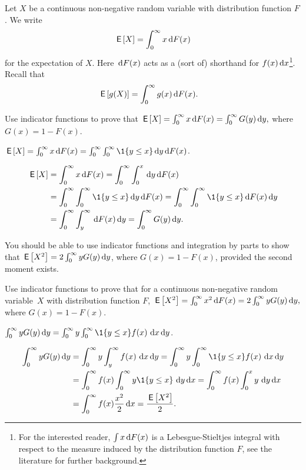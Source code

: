 Let $X$ be a continuous non-negative random variable with distribution function $F$. We write 
\begin{equation*}
 \,\mathsf{E}\left[X\right] = \int_0^\infty x \,\text{d}F(x)
\end{equation*}
for the expectation of $X$.
Here $\,\text{d}F(x)$ acts as a (sort of) shorthand for $f(x) \,\text{d}x$\footnote{For the interested reader, $\int x \,\text{d}F(x)$ is a Lebesgue-Stieltjes integral with respect to the measure induced by the distribution function $F$, see the literature for further background.}.
Recall that
\begin{align*}
\,\mathsf{E}\left[g(X)\right] &= \int_0^\infty g(x) \,\text{d}F(x).
\end{align*}



\begin{exercise}
 Use indicator functions to prove that 
$ \,\mathsf{E}\left[X\right] = \int_0^\infty x \,\text{d}F(x) = \int_0^\infty G(y) \,\text{d}y,$
where $G(x) = 1 - F(x)$. 
\begin{hint}
$\E X = \int_0^\infty x \d F(x) = \int_0^\infty \int_0^\infty \1{y\leq x} \d y \d F(x)$.
\end{hint}
\begin{solution}
 \begin{align*}
 \E{X} &= \int_0^\infty x \d F(x) = \int_0^\infty \int_0^x \d y \d F(x) \\
 & = \int_0^\infty \int_0^\infty \1{y\leq x} \d y \d F(x) = \int_0^\infty \int_0^\infty \1{y\leq x} \d F(x) \d y\\
 & = \int_0^\infty \int_y^\infty \d F(x) \d y = \int_0^\infty G(y) \d y.
 \end{align*}
\end{solution}
\end{exercise}

You should be able to use indicator functions and integration by parts to show that $\,\mathsf{E}\left[X^2\right] = 2\int_0^\infty y G(y) \,\text{d}y$, where $G(x) = 1- F(x)$, provided the second moment exists.

\begin{extra}
 Use indicator functions to prove that for a continuous non-negative random variable~$X$ with distribution function $F$, $ \,\mathsf{E}\left[X^2\right] = \int_0^\infty x^2 \,\text{d}F(x) = 2 \int_0^\infty y G(y) \,\text{d}y,$ where $G(x) = 1 - F(x)$.
\begin{hint}
$\int_0^\infty y G(y) \d y = \int_0^\infty y \int_0^\infty \1{y\leq x}f(x)\, \d x \d y$.
\end{hint}
\begin{solution}
 \begin{align*}
\int_0^\infty y G(y) \d y 
&= \int_0^\infty y \int_y^\infty f(x)\, \d x \d y = \int_0^\infty y \int_0^\infty \1{y\leq x}f(x)\, \d x \d y\\
&= \int_0^\infty f(x) \int_0^\infty y \1{y \leq x}\, \d y \d x
= \int_0^\infty f(x) \int_0^x y\, \d y \d x\\
&= \int_0^\infty f(x) \frac{x^2}2 \d x =\frac{\E{X^2}}2.
 \end{align*}
\end{solution}
\end{extra}

